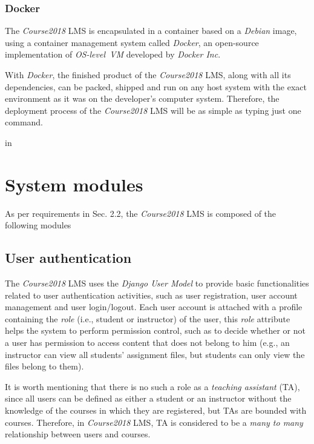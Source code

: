 \subsubsection{Docker}
The \emph{Course2018} LMS is encapsulated in a container based on a
\emph{Debian} image, using a container management system called \emph{Docker},
an open-source implementation of \emph{OS-level~VM} developed by
\emph{Docker Inc}.

\medskip

With \emph{Docker}, the finished product of the
\emph{Course2018} LMS, along with all its dependencies, can be packed, shipped
and run on any host system with the exact environment as it was on the
developer's computer system. Therefore, the deployment process of the
\emph{Course2018} LMS will be as simple as typing just one command.

 in


\section{System modules}

As per requirements in Sec. 2.2, the \emph{Course2018} LMS is composed of the
following modules

\subsection{User authentication}
The \emph{Course2018} LMS uses the \emph{Django User Model} \cite{djangoUser}
to provide
basic functionalities related to user authentication activities, such as
user registration, user account management and user login/logout.
Each user account is attached with a profile containing the \emph{role}
(i.e., student or instructor) of the user, this \emph{role} attribute helps
the system to perform permission control, such as to
decide whether or not a user has permission to access content
that does not belong to him (e.g., an instructor can view all students' assignment
files, but students can only view the files belong to them).

\medskip

It is worth mentioning that there is no such a role as a \emph{teaching
assistant} (TA), since all users can be defined as either a student or an
instructor without the knowledge of the courses in which they are registered,
but TAs are bounded with courses. Therefore, in \emph{Course2018} LMS, TA is
considered to be a \emph{many to many} relationship between users and courses.

